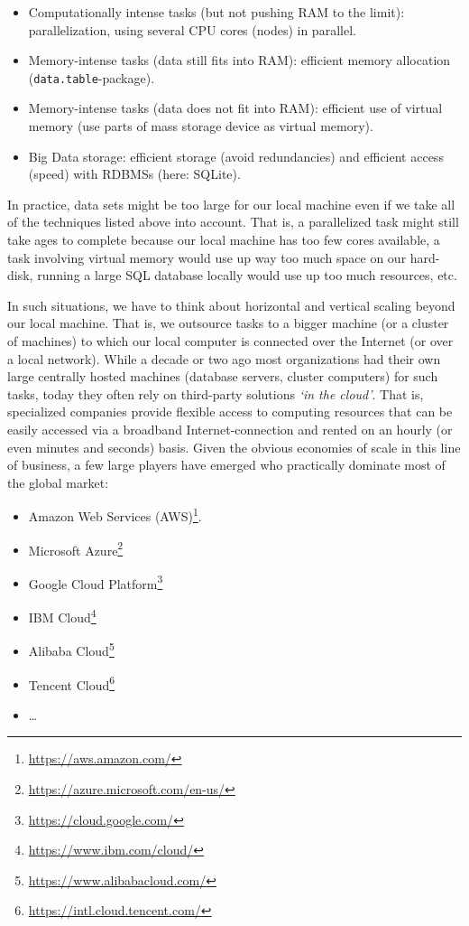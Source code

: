 \documentclass[
  12pt,
]{style/krantz}
\providecommand{\tightlist}{%
  \setlength{\itemsep}{0pt}\setlength{\parskip}{0pt}}
\renewcommand{\href}[2]{#2\footnote{\url{#1}}}
\begin{document}
\begin{itemize}
\tightlist
\item
  Computationally intense tasks (but not pushing RAM to the limit): parallelization, using several CPU cores (nodes) in parallel.
\item
  Memory-intense tasks (data still fits into RAM): efficient memory allocation (\texttt{data.table}-package).
\item
  Memory-intense tasks (data does not fit into RAM): efficient use of virtual memory (use parts of mass storage device as virtual memory).
\item
  Big Data storage: efficient storage (avoid redundancies) and efficient access (speed) with RDBMSs (here: SQLite).
\end{itemize}

In practice, data sets might be too large for our local machine even if we take all of the techniques listed above into account. That is, a parallelized task might still take ages to complete because our local machine has too few cores available, a task involving virtual memory would use up way too much space on our hard-disk, running a large SQL database locally would use up too much resources, etc.

In such situations, we have to think about horizontal and vertical scaling beyond our local machine. That is, we outsource tasks to a bigger machine (or a cluster of machines) to which our local computer is connected over the Internet (or over a local network). While a decade or two ago most organizations had their own large centrally hosted machines (database servers, cluster computers) for such tasks, today they often rely on third-party solutions \emph{`in the cloud'}. That is, specialized companies provide flexible access to computing resources that can be easily accessed via a broadband Internet-connection and rented on an hourly (or even minutes and seconds) basis. Given the obvious economies of scale in this line of business, a few large players have emerged who practically dominate most of the global market:

\begin{itemize}
\tightlist
\item
  \href{https://aws.amazon.com/}{Amazon Web Services (AWS)}.
\item
  \href{https://azure.microsoft.com/en-us/}{Microsoft Azure}
\item
  \href{https://cloud.google.com/}{Google Cloud Platform}
\item
  \href{https://www.ibm.com/cloud/}{IBM Cloud}
\item
  \href{https://www.alibabacloud.com/}{Alibaba Cloud}
\item
  \href{https://intl.cloud.tencent.com/}{Tencent Cloud}
\item
  \ldots{}
\end{itemize}
\end{document}
